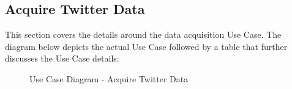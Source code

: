 \documentclass[12pt]{article} %
\begin{document}
   
  
    	
   \subsection{Acquire Twitter Data}
	
	This section covers the details around the data acquisition Use Case. The diagram below depicts the actual Use Case followed by a table that further discusses the Use Case details:
	
		\begin{figure}[H] %
			\caption{Use Case Diagram - Acquire Twitter Data}
			\label{fig:speciation}
		\end{figure}
		
\end{document}
